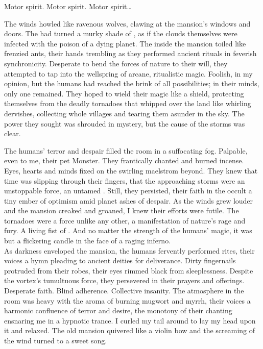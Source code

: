 Motor spirit. Motor spirit. Motor spirit… \\



The winds howled like ravenous wolves, clawing at the mansion's windows and doors. The  had turned a murky shade of , as if the clouds themselves were infected with the poison of a dying planet. The  inside the mansion toiled like frenzied ants, their hands trembling as they performed ancient rituals in feverish synchronicity. Desperate to bend the forces of nature to their will, they attempted to tap into the wellspring of arcane, ritualistic magic. Foolish, in my opinion, but the humans had reached the brink of all possibilities; in their minds, only one remained. They hoped to wield their magic like a shield, protecting themselves from the deadly tornadoes that whipped over the land like whirling dervishes, collecting whole villages and tearing them asunder in the sky. The power they sought was shrouded in mystery, but the cause of the storms was clear. \\


The humans' terror and despair filled the room in a suffocating fog. Palpable, even to me, their pet  Monster. They frantically chanted and burned incense. Eyes, hearts and minds fixed on the swirling maelstrom beyond. They knew that time was slipping through their fingers, that the approaching storms were an unstoppable force, an untamed . Still, they persisted, their faith in the occult a tiny ember of optimism amid planet  ashes of despair. As the winds grew louder and the mansion creaked and groaned, I knew their efforts were futile. The tornadoes were a force unlike any other, a manifestation of nature's rage and fury. A living fist of . And no matter the strength of the humans' magic, it was but a flickering candle in the face of a raging inferno. \\

As darkness enveloped the mansion, the humans fervently performed rites, their voices a hymn pleading to ancient deities for deliverance. Dirty fingernails protruded from their robes, their eyes rimmed black from sleeplessness. Despite the vortex's tumultuous force, they persevered in their prayers and offerings. Desperate faith. Blind adherence. Collective insanity. The atmosphere in the room was heavy with the aroma of burning mugwort and myrrh, their voices a harmonic confluence of terror and desire, the monotony of their chanting ensnaring me in a hypnotic trance. I curled my tail around to lay my head upon it and relaxed. The old mansion quivered like a violin bow and the screaming of the wind turned to a sweet song. \\

